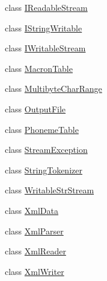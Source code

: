 \begin{DoxyCompactItemize}
class \hyperlink{classsinsy_1_1IReadableStream}{\-I\-Readable\-Stream}
\item 
class \hyperlink{classsinsy_1_1IStringWritable}{\-I\-String\-Writable}
\item 
class \hyperlink{classsinsy_1_1IWritableStream}{\-I\-Writable\-Stream}
\item 
class \hyperlink{classsinsy_1_1MacronTable}{\-Macron\-Table}
\item 
class \hyperlink{classsinsy_1_1MultibyteCharRange}{\-Multibyte\-Char\-Range}
\item 
class \hyperlink{classsinsy_1_1OutputFile}{\-Output\-File}
\item 
class \hyperlink{classsinsy_1_1PhonemeTable}{\-Phoneme\-Table}
\item 
class \hyperlink{classsinsy_1_1StreamException}{\-Stream\-Exception}
\item 
class \hyperlink{classsinsy_1_1StringTokenizer}{\-String\-Tokenizer}
\item 
class \hyperlink{classsinsy_1_1WritableStrStream}{\-Writable\-Str\-Stream}
\item 
class \hyperlink{classsinsy_1_1XmlData}{\-Xml\-Data}
\item 
class \hyperlink{classsinsy_1_1XmlParser}{\-Xml\-Parser}
\item 
class \hyperlink{classsinsy_1_1XmlReader}{\-Xml\-Reader}
\item 
class \hyperlink{classsinsy_1_1XmlWriter}{\-Xml\-Writer}
\end{DoxyCompactItemize}
